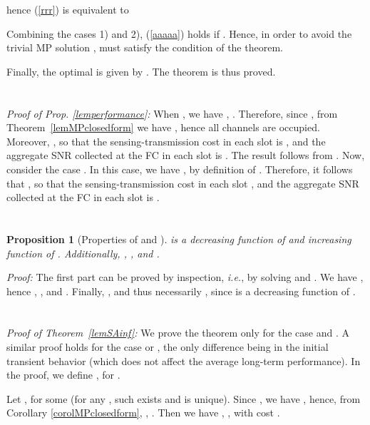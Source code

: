 \documentclass[10pt,twocolumn,twoside]{IEEEtran}
\newtheorem{propos}{Proposition}
\theoremstyle{plain}
\begin{document}
hence (\ref{rrr}) is equivalent to 

Combining the cases 1) and 2), (\ref{aaaaa}) holds  if .
Hence, in order to avoid the trivial MP solution ,
  must satisfy the condition of the theorem.
 
 Finally, the optimal  is given by . The theorem is thus proved.
\hfill\QED

\vspace{-3mm}
\section{}
\label{proofoflemperformance}
\noindent\emph{Proof of Prop. \ref{lemperformance}:}
When , we have
,
.
Therefore, since , from Theorem~\ref{lemMPclosedform} we have , hence all channels are occupied.
Moreover, , so that the sensing-transmission cost in each slot is , and the aggregate SNR collected at the FC in each slot is . The result follows from \cite[Prop.~7]{MichelusiP1}.
Now, consider the case . In this case, we have ,
by definition of . Therefore, it follows that , so that
 the sensing-transmission cost in each slot , and the aggregate SNR collected at the FC in each slot is .
\hfill\QED

\vspace{-3mm}
\section{}
\label{proofofeta}
\begin{propos}[Properties of  and ]
\label{eta}
 is a decreasing function of  and increasing function of .
Additionally, , , and .
\end{propos}
\noindent\emph{Proof:}
The first part can be proved by inspection, \emph{i.e.}, by solving   and
.
We have , hence , ,
and .
Finally, , and thus necessarily , since  
is a decreasing function of .~\hfill\QED

\vspace{-3mm}
\section{}
\label{proofoflemSAinf}
\noindent\emph{Proof of Theorem~\ref{lemSAinf}:}
We prove the theorem only for the case  and . A similar proof holds for the case
 or , the only difference being in the initial transient behavior (which does not affect the
average long-term performance). In the proof, we define , for .

Let , for some  (for any , such  exists and is unique).
Since , we have , hence,
from Corollary \ref{corolMPclosedform}, , .
Then we have ,  ,
with cost .
\end{document}

